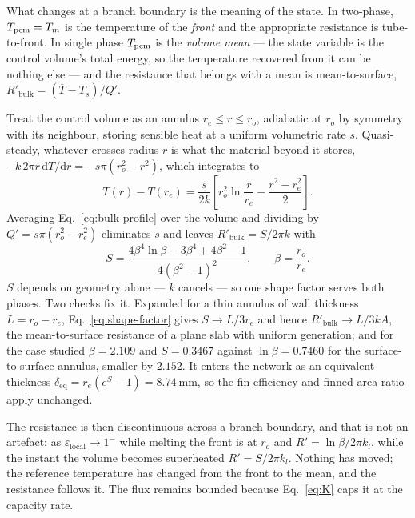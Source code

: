 What changes at a branch boundary is the meaning of the state. In two-phase,
$T_{\mathrm{pcm}}=T_{m}$ is the temperature of the \emph{front} and the appropriate
resistance is tube-to-front. In single phase $T_{\mathrm{pcm}}$ is the \emph{volume mean}
--- the state variable is the control volume's total energy, so the temperature
recovered from it can be nothing else --- and the resistance that belongs with a
mean is mean-to-surface, $R'_{\mathrm{bulk}}=(\overline{T}-T_{s})/Q'$.

Treat the control volume as an annulus $r_{e}\le r\le r_{o}$, adiabatic at
$r_{o}$ by symmetry with its neighbour, storing sensible heat at a uniform
volumetric rate $s$. Quasi-steady, whatever crosses radius $r$ is what the
material beyond it stores, $-k\,2\pi r\,\mathrm{d}T/\mathrm{d}r
=-s\pi(r_{o}^{2}-r^{2})$, which integrates to
\begin{equation}
  T(r)-T(r_{e}) = \frac{s}{2k}
  \left[r_{o}^{2}\ln\frac{r}{r_{e}}-\frac{r^{2}-r_{e}^{2}}{2}\right].
  \label{eq:bulk-profile}
\end{equation}
Averaging Eq.~\eqref{eq:bulk-profile} over the volume and dividing by
$Q'=s\pi(r_{o}^{2}-r_{e}^{2})$ eliminates $s$ and leaves
$R'_{\mathrm{bulk}}=S/2\pi k$ with
\begin{equation}
  S=\frac{4\beta^{4}\ln\beta-3\beta^{4}+4\beta^{2}-1}
         {4\left(\beta^{2}-1\right)^{2}},
  \qquad \beta=\frac{r_{o}}{r_{e}} .
  \label{eq:shape-factor}
\end{equation}
$S$ depends on geometry alone --- $k$ cancels --- so one shape factor serves both
phases. Two checks fix it. Expanded for a thin annulus of wall thickness
$L=r_{o}-r_{e}$, Eq.~\eqref{eq:shape-factor} gives $S\to L/3r_{e}$ and hence
$R'_{\mathrm{bulk}}\to L/3kA$, the mean-to-surface resistance of a plane slab
with uniform generation; and for the case studied $\beta=2.109$ and $S=0.3467$
against $\ln\beta=0.7460$ for the surface-to-surface annulus, smaller by
$2.152$. It enters the network as an equivalent thickness
$\delta_{\mathrm{eq}}=r_{e}(e^{S}-1)=\SI{8.74}{\milli\meter}$, so the fin
efficiency and finned-area ratio apply unchanged.

The resistance is then discontinuous across a branch boundary, and that is not
an artefact: as $\varepsilon_{\mathrm{local}}\to1^{-}$ while melting the front
is at $r_{o}$ and $R'=\ln\beta/2\pi k_{l}$, while the instant the volume becomes
superheated $R'=S/2\pi k_{l}$. Nothing has moved; the reference temperature has
changed from the front to the mean, and the resistance follows it. The flux
remains bounded because Eq.~\eqref{eq:K} caps it at the capacity rate.

